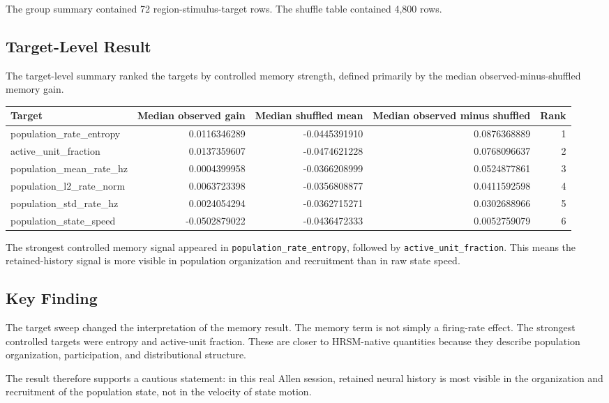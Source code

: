 The group summary contained 72 region-stimulus-target rows. The shuffle table contained 4,800 rows.

\subsection{Target-Level Result}

The target-level summary ranked the targets by controlled memory strength, defined primarily by the median observed-minus-shuffled memory gain.

\begin{center}
\begin{tabular}{lrrrr}
\hline
Target & Median observed gain & Median shuffled mean & Median observed minus shuffled & Rank \\
\hline
population\_rate\_entropy & 0.0116346289 & -0.0445391910 & 0.0876368889 & 1 \\
active\_unit\_fraction & 0.0137359607 & -0.0474621228 & 0.0768096637 & 2 \\
population\_mean\_rate\_hz & 0.0004399958 & -0.0366208999 & 0.0524877861 & 3 \\
population\_l2\_rate\_norm & 0.0063723398 & -0.0356808877 & 0.0411592598 & 4 \\
population\_std\_rate\_hz & 0.0024054294 & -0.0362715271 & 0.0302688966 & 5 \\
population\_state\_speed & -0.0502879022 & -0.0436472333 & 0.0052759079 & 6 \\
\hline
\end{tabular}
\end{center}

The strongest controlled memory signal appeared in \texttt{population\_rate\_entropy}, followed by \texttt{active\_unit\_fraction}. This means the retained-history signal is more visible in population organization and recruitment than in raw state speed.

\subsection{Key Finding}

The target sweep changed the interpretation of the memory result. The memory term is not simply a firing-rate effect. The strongest controlled targets were entropy and active-unit fraction. These are closer to HRSM-native quantities because they describe population organization, participation, and distributional structure.

The result therefore supports a cautious statement: in this real Allen session, retained neural history is most visible in the organization and recruitment of the population state, not in the velocity of state motion.

